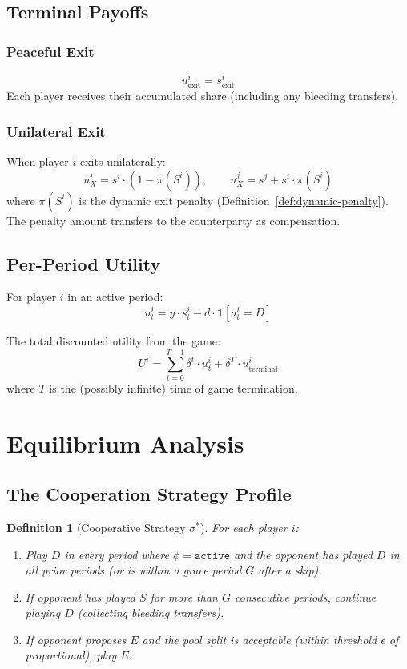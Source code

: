\documentclass[12pt]{article}
\newtheorem{definition}{Definition}
\begin{document}
\subsection{Terminal Payoffs}

\subsubsection{Peaceful Exit}
\[
u_{\text{exit}}^i = s_{\text{exit}}^i
\]
Each player receives their accumulated share (including any bleeding transfers).

\subsubsection{Unilateral Exit}
When player $i$ exits unilaterally:
\[
u_X^i = s^i \cdot (1 - \pi(S^i)), \qquad u_X^j = s^j + s^i \cdot \pi(S^i)
\]
where $\pi(S^i)$ is the dynamic exit penalty (Definition~\ref{def:dynamic-penalty}). The penalty amount transfers to the counterparty as compensation.

\subsection{Per-Period Utility}

For player $i$ in an active period:
\[
u_t^i = y \cdot s_t^i - d \cdot \mathbf{1}[a_t^i = D]
\]

The total discounted utility from the game:
\[
U^i = \sum_{t=0}^{T-1} \delta^t \cdot u_t^i + \delta^T \cdot u_{\text{terminal}}^i
\]
where $T$ is the (possibly infinite) time of game termination.



\section{Equilibrium Analysis}
\label{sec:equilibrium}

\subsection{The Cooperation Strategy Profile}

\begin{definition}[Cooperative Strategy $\sigma^*$]
For each player $i$:
\begin{enumerate}
    \item Play $D$ in every period where $\phi = \texttt{active}$ and the opponent has played $D$ in all prior periods (or is within a grace period $G$ after a skip).
    \item If opponent has played $S$ for more than $G$ consecutive periods, continue playing $D$ (collecting bleeding transfers).
    \item If opponent proposes $E$ and the pool split is acceptable (within threshold $\epsilon$ of proportional), play $E$.
\end{enumerate}
\end{definition}
\end{document}
